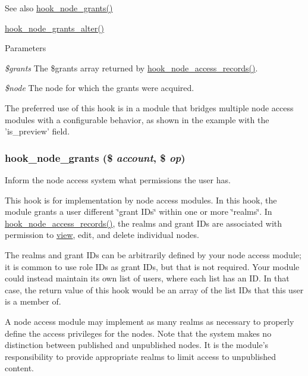 \begin{DoxySeeAlso}{See also}
\hyperlink{group__node__access_gaa973f2ab6ab14c3fa14e5138c6d69ecf}{hook\_\-node\_\-grants()} 

\hyperlink{group__node__access_ga21e95e2bd0b4ed12d861aa83426a8ba3}{hook\_\-node\_\-grants\_\-alter()}
\end{DoxySeeAlso}

\begin{DoxyParams}{Parameters}
\item[{\em \$grants}]The \$grants array returned by \hyperlink{group__node__access_ga3fe7744d74446e40e9b9ad2a782b4269}{hook\_\-node\_\-access\_\-records()}. \item[{\em \$node}]The node for which the grants were acquired.\end{DoxyParams}
The preferred use of this hook is in a module that bridges multiple node access modules with a configurable behavior, as shown in the example with the 'is\_\-preview' field. \hypertarget{group__node__access_gaa973f2ab6ab14c3fa14e5138c6d69ecf}{
\subsubsection[{hook\_\-node\_\-grants}]{\setlength{\rightskip}{0pt plus 5cm}hook\_\-node\_\-grants (\$ {\em account}, \/  \$ {\em op})}}
\label{group__node__access_gaa973f2ab6ab14c3fa14e5138c6d69ecf}
Inform the node access system what permissions the user has.

This hook is for implementation by node access modules. In this hook, the module grants a user different \char`\"{}grant IDs\char`\"{} within one or more \char`\"{}realms\char`\"{}. In \hyperlink{group__node__access_ga3fe7744d74446e40e9b9ad2a782b4269}{hook\_\-node\_\-access\_\-records()}, the realms and grant IDs are associated with permission to \hyperlink{classview}{view}, edit, and delete individual nodes.

The realms and grant IDs can be arbitrarily defined by your node access module; it is common to use role IDs as grant IDs, but that is not required. Your module could instead maintain its own list of users, where each list has an ID. In that case, the return value of this hook would be an array of the list IDs that this user is a member of.

A node access module may implement as many realms as necessary to properly define the access privileges for the nodes. Note that the system makes no distinction between published and unpublished nodes. It is the module's responsibility to provide appropriate realms to limit access to unpublished content.


